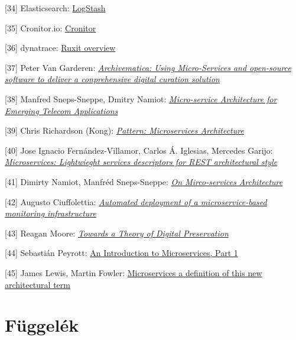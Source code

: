 \documentclass[11pt,magyar,a4paper,oneside,]{report}
\begin{document}
{[}34{]} Elasticsearch:
\href{https://www.elastic.co/products/logstash}{LogStash}

{[}35{]} Cronitor.io: \href{https://cronitor.io/}{Cronitor}

{[}36{]} dynatrace:
\href{https://ruxit.com/why-ruxit/overview/\#whyruxitoverview_start}{Ruxit
overview}

{[}37{]} Peter Van Garderen:
\href{http://citeseerx.ist.psu.edu/viewdoc/download?doi=10.1.1.384.7168\&rep=rep1\&type=pdf\#page=145}{\emph{Archivematica:
Using Micro-Services and open-source software to deliver a conprehensive
digital curation solution}}

{[}38{]} Manfred Sneps-Sneppe, Dmitry Namiot:
\href{http://injoit.ru/index.php/j1/article/view/161/119}{\emph{Micro-service
Architecture for Emerging Telecom Applications}}

{[}39{]} Chris Richardson (Kong):
\href{http://microservices.io/patterns/microservices.html}{\emph{Pattern:
Microservices Architecture}}

{[}40{]} Jose Ignacio Fernández-Villamor, Carlos Á. Iglesias, Mercedes
Garijo:
\href{http://oa.upm.es/8128/1/INVE_MEM_2010_81293.pdf}{\emph{Microservices:
Lightwieght services descriptors for REST architectural style}}

{[}41{]} Dimirty Namiot, Manfréd Sneps-Sneppe:
\href{http://cyberleninka.ru/article/n/on-micro-services-architecture}{\emph{On
Mirco-services Architecture}}

{[}42{]} Augusto Ciuffolettia:
\href{http://ac.els-cdn.com/S187705091503077X/1-s2.0-S187705091503077X-main.pdf?_tid=83f9a800-e3fa-11e5-9747-00000aacb35e\&acdnat=1457310260_fa7b3e651c221cf0307fbb2d6c7f59a6}{\emph{Automated
deployment of a microservice-based monitoring infrastructure}}

{[}43{]} Reagan Moore:
\href{http://ijdc.net/index.php/ijdc/article/view/63/42}{\emph{Towards a
Theory of Digital Preservation}}

{[}44{]} Sebastián Peyrott:
\href{https://auth0.com/blog/2015/09/04/an-introduction-to-microservices-part-1/}{An
Introduction to Microservices, Part 1}

{[}45{]} James Lewis, Martin Fowler:
\href{http://martinfowler.com/articles/microservices.html}{Microservices
a definition of this new architectural term}

\listoftables
\listoffigures



\appendix

\chapter{Függelék}\label{fuxfcggeluxe9k}
\end{document}
